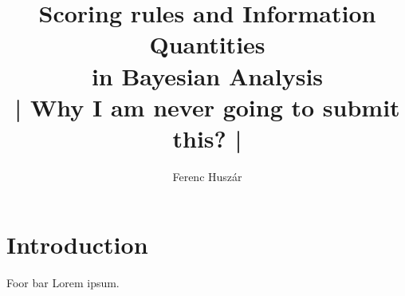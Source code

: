 \documentclass{book}
\title{Scoring rules and Information Quantities\\in Bayesian Analysis \\ | Why I am never going to submit this? |}
\author{Ferenc Husz\'{a}r}
\begin{document}
\maketitle

\tableofcontents
\chapter{Introduction}
Foor bar Lorem ipsum.






\end{document}
